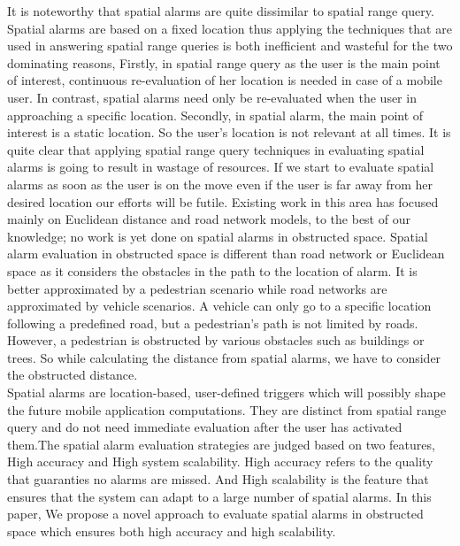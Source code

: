 It is noteworthy that spatial alarms are quite dissimilar to spatial range query. Spatial alarms are based on a fixed location thus applying the techniques that are used in answering spatial range queries is both inefficient and wasteful for the two dominating reasons, Firstly, in spatial range query as the user is the main point of interest, continuous re-evaluation of her location is needed in case of a mobile user. In contrast, spatial alarms need only be re-evaluated when the user in approaching a specific location. Secondly, in spatial alarm, the main point of interest is a static location. So the user's location is not relevant at all times. It is quite clear that applying spatial range query techniques in evaluating spatial alarms is going to result in wastage of resources. If we start to evaluate spatial alarms as soon as the user is on the move even if the user is far away from her desired location our efforts will be futile. 
\vspace*{10pt}
Existing work in this area has focused mainly on Euclidean distance and road network models, to the best of our knowledge; no work is yet done on spatial alarms in obstructed space. Spatial alarm evaluation in obstructed space is different than road network or Euclidean space as it considers the obstacles in the path to the location of alarm. It is better approximated by a pedestrian scenario while road networks are approximated by vehicle scenarios. A vehicle can only go to a specific location following a predefined road, but a pedestrian's path is not limited by roads. However, a pedestrian is obstructed by various obstacles such as buildings or trees. So while calculating the distance from spatial alarms, we have to consider the obstructed distance.\\
\vspace*{10pt}
Spatial alarms are location-based, user-defined triggers which will possibly shape the future mobile application computations. They are distinct from spatial range query and do not need immediate evaluation after the user has activated them.The spatial alarm evaluation strategies are judged based on two features, High accuracy and High system scalability. High accuracy refers to the quality that guaranties no alarms are missed. And High scalability is the feature that ensures that the system can adapt to a large number of spatial alarms.
In this paper, We propose a novel approach to evaluate spatial alarms in obstructed space which ensures both high accuracy and high scalability.
\vspace*{10pt}


